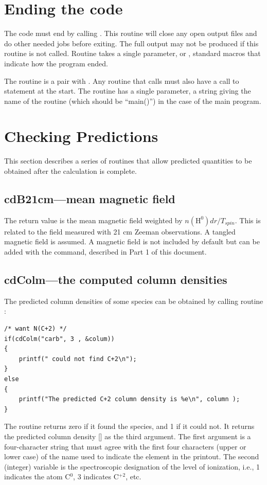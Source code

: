 \section{Ending the code}

The code must end by calling .
This routine will close any open
output files and do other needed jobs before exiting.
The full output may
not be produced if this routine is not called.
Routine  takes a single
parameter,  or ,
standard macros that indicate how
the program ended.

The routine  is a pair with .
Any routine that calls
 must also have a call to  statement at the start.  The
routine  has a single parameter, a string giving the name of
the routine (which should be ``main()'') in the case of the main program.

\section{Checking Predictions}

This section describes a series of routines that allow predicted
quantities to be obtained after the calculation is complete.

\subsection{cdB21cm---mean magnetic field}

The return value is the mean magnetic field weighted by
$n(\mathrm{H}^0) dr/T_{spin}$.
This is related to the field measured with 21 cm Zeeman
observations.
A tangled magnetic field is assumed.
A magnetic field is
not included by default but can be added with the
 command, described in Part 1 of this document.

\subsection{cdColm---the computed column densities }
\label{sec:SubroutineCdColm}

The predicted column densities of some species can be obtained by
calling routine :
\begin{verbatim}
/* want N(C+2) */
if(cdColm("carb", 3 , &colum))
{
    printf(" could not find C+2\n");
}
else
{
    printf("The predicted C+2 column density is %e\n", column );
}
\end{verbatim}
The routine returns zero if it found the species, and 1 if it could not.
It returns the predicted column density [\pscm] as the third argument.  The
first argument  is a four-character string that must agree with the
first four characters (upper or lower case) of the name used to indicate
the element in the printout.
The second (integer) variable  is the
spectroscopic designation of the level of ionization, i.e., 1 indicates
the atom C$^0$, 3 indicates C$^{+2}$, etc.

